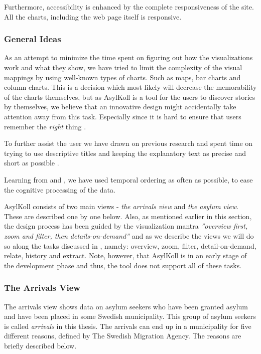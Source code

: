 \documentclass{acmtog} %
\begin{document}
Furthermore, accessibility is enhanced by the complete responsiveness of the site. All the charts, including the web page itself is responsive.

\subsubsection{General Ideas}
\label{subsub:general_ideas}
As an attempt to minimize the time spent on figuring out how the visualizations work and what they show, we have tried to limit the complexity of the visual mappings by using well-known types of charts. Such as maps, bar charts and column charts. This is a decision which most likely will decrease the memorability of the charts themselves, but as AsylKoll is a tool for the users to discover stories by themselves, we believe that an innovative design might accidentally take attention away from this task. Especially since it is hard to ensure that users remember the \emph{right} thing \cite{borkin2013makes}.

To further assist the user we have drawn on previous research and spent time on trying to use descriptive titles and keeping the explanatory text as precise and short as possible \cite{borkin2016beyond,borkin2013makes,segel2010narrative}.

Learning from \citet{hullman2011visualization} and \citet{hullman2013deeper}, we have used temporal ordering as often as possible, to ease the cognitive processing of the data.

AsylKoll consists of two main views - \emph{the arrivals view} and \emph{the asylum view}. These are described one by one below. Also, as mentioned earlier in this section, the design process has been guided by the visualization mantra \emph{''overview first, zoom and filter, then details-on-demand''} and as we describe the views we will do so along the tasks discussed in \citet{shneiderman1996eyes}, namely: overview, zoom, filter, detail-on-demand, relate, history and extract. Note, however, that AsylKoll is in an early stage of the development phase and thus, the tool does not support all of these tasks. 

\subsubsection{The Arrivals View}
\label{subsub:view1}
The arrivals view shows data on asylum seekers who have been granted asylum and have been placed in some Swedish municipality. This group of asylum seekers is called \emph{arrivals} in this thesis. The arrivals can end up in a municipality for five different reasons, defined by The Swedish Migration Agency. The reasons are briefly described below.
\end{document}
